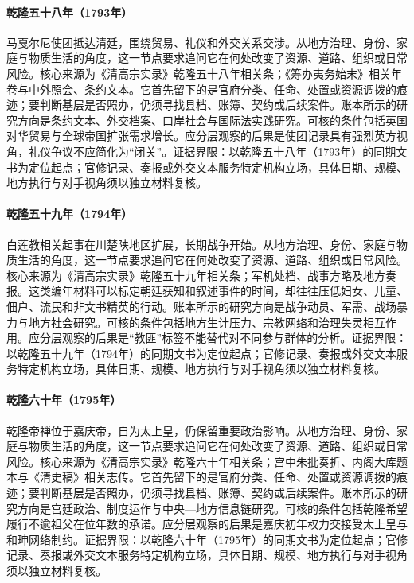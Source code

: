 \hypertarget{social:EQ-1793-MACARTNEY-MISSION}{}\paragraph{乾隆五十八年（1793年）}马戛尔尼使团抵达清廷，围绕贸易、礼仪和外交关系交涉。从地方治理、身份、家庭与物质生活的角度，这一节点要求追问它在何处改变了资源、道路、组织或日常风险。核心来源为《清高宗实录》乾隆五十八年相关条；《筹办夷务始末》相关年卷与中外照会、条约文本。它首先留下的是官府分类、任命、处置或资源调拨的痕迹；要判断基层是否照办，仍须寻找县档、账簿、契约或后续案件。账本所示的研究方向是条约文本、外交档案、口岸社会与国际法实践研究。可核的条件包括英国对华贸易与全球帝国扩张需求增长。应分层观察的后果是使团记录具有强烈英方视角，礼仪争议不应简化为“闭关”。证据界限：以乾隆五十八年（1793年）的同期文书为定位起点；官修记录、奏报或外交文本服务特定机构立场，具体日期、规模、地方执行与对手视角须以独立材料复核。
\hypertarget{social:EQ-1794-WHITE-LOTUS-OUTBREAK}{}\paragraph{乾隆五十九年（1794年）}白莲教相关起事在川楚陕地区扩展，长期战争开始。从地方治理、身份、家庭与物质生活的角度，这一节点要求追问它在何处改变了资源、道路、组织或日常风险。核心来源为《清高宗实录》乾隆五十九年相关条；军机处档、战事方略及地方奏报。这类编年材料可以标定朝廷获知和叙述事件的时间，却往往压低妇女、儿童、佃户、流民和非文书精英的行动。账本所示的研究方向是战争动员、军需、战场暴力与地方社会研究。可核的条件包括地方生计压力、宗教网络和治理失灵相互作用。应分层观察的后果是“教匪”标签不能替代对不同参与群体的分析。证据界限：以乾隆五十九年（1794年）的同期文书为定位起点；官修记录、奏报或外交文本服务特定机构立场，具体日期、规模、地方执行与对手视角须以独立材料复核。
\hypertarget{social:EQ-1795-QIANLONG-ABDICATION}{}\paragraph{乾隆六十年（1795年）}乾隆帝禅位于嘉庆帝，自为太上皇，仍保留重要政治影响。从地方治理、身份、家庭与物质生活的角度，这一节点要求追问它在何处改变了资源、道路、组织或日常风险。核心来源为《清高宗实录》乾隆六十年相关条；宫中朱批奏折、内阁大库题本与《清史稿》相关志传。它首先留下的是官府分类、任命、处置或资源调拨的痕迹；要判断基层是否照办，仍须寻找县档、账簿、契约或后续案件。账本所示的研究方向是宫廷政治、制度运作与中央—地方信息链研究。可核的条件包括乾隆希望履行不逾祖父在位年数的承诺。应分层观察的后果是嘉庆初年权力交接受太上皇与和珅网络制约。证据界限：以乾隆六十年（1795年）的同期文书为定位起点；官修记录、奏报或外交文本服务特定机构立场，具体日期、规模、地方执行与对手视角须以独立材料复核。
